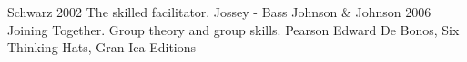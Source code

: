 \begin{thebibliography}{3} %
	Schwarz 2002 The skilled facilitator. Jossey - Bass
	Johnson \& Johnson 2006 Joining Together. Group theory and group skills. Pearson
	Edward De Bonos, Six Thinking Hats, Gran Ica Editions

\end{thebibliography}